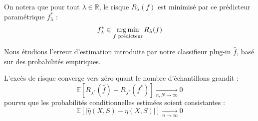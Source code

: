On notera que pour tout $\lambda \in \mathbb{R}$, le risque $R_\lambda(f)$ est minimisé par ce prédicteur paramétrique $f^*_\lambda$ :
\begin{equation}
    f^*_\lambda \in \operatorname*{arg\,min}_{f \text{ prédicteur}} R_\lambda(f)
\end{equation}

Nous étudions l'erreur d'estimation introduite par notre classifieur plug-in $\hat{f}$, basé sur des probabilités empiriques.

\begin{theoreme}
    L'excès de risque converge vers zéro quant le nombre d'échantillons grandit :
    \begin{equation}
        \mathbb{E} \left[ R_{\lambda^*}(\hat{f}) - R_{\lambda^*}(f^*) \right] \xrightarrow[n, N \to \infty]{} 0
    \end{equation}
    pourvu que les probabilités conditionnelles estimées soient consistantes :
    \begin{equation}
        \mathbb{E} \left[ |\hat{\eta}(X, S) - \eta(X, S)| \right] \xrightarrow[n \to \infty]{} 0
    \end{equation}
\end{theoreme}

